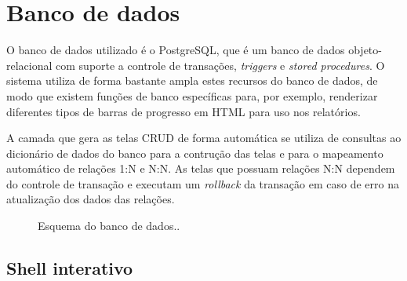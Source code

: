 \documentclass[9pt]{report}
\begin{document}
   \chapter{Banco de dados}

   O banco de dados utilizado é o PostgreSQL, que é um
   banco de dados objeto-relacional com suporte a controle
   de transações, \textit{triggers} e \textit{stored procedures}.
   O sistema utiliza de forma bastante ampla estes recursos do
   banco de dados, de modo que existem funções de banco
   específicas para, por exemplo, renderizar diferentes tipos
   de barras de progresso em HTML para uso nos relatórios.

   A camada que gera as telas CRUD de forma automática se utiliza
   de consultas ao dicionário de dados do banco para a
   contrução das telas e para o mapeamento automático de
   relações 1:N e N:N. As telas que possuam relações N:N
   dependem do controle de transação e executam um \textit{rollback}
   da transação em caso de erro na atualização dos dados das
   relações.


     \begin{figure}[H]
       \caption{Esquema do banco de dados..}
       \label{fig:dbSchema}
     \end{figure}

   
    \section{Shell interativo}
    
\end{document}
